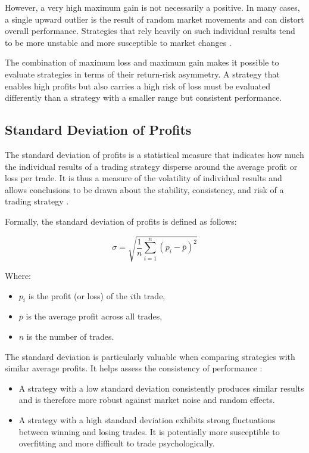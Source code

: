 However, a very high maximum gain is not necessarily a positive.
In many cases, a single upward outlier is the result of random market movements and can distort overall performance.
Strategies that rely heavily on such individual results tend to be more unstable and more susceptible to market changes \cite{max-gain}.

The combination of maximum loss and maximum gain makes it possible to evaluate strategies in terms of their return-risk asymmetry.
A strategy that enables high profits but also carries a high risk of loss must be evaluated differently than a strategy with a smaller range but consistent performance.

\subsection{Standard Deviation of Profits}

The standard deviation of profits is a statistical measure that indicates how much the individual results of a trading strategy disperse around the average profit or loss per trade.
It is thus a measure of the volatility of individual results and allows conclusions to be drawn about the stability, consistency, and risk of a trading strategy \cite{std}.

Formally, the standard deviation of profits is defined as follows:

\[
    \sigma = \sqrt{\frac{1}{n} \sum_{i=1}^n (p_i - \bar{p})^2}
\]

\noindent
Where:

\begin{itemize}
    \item \(p_i\) is the profit (or loss) of the \(i\)th trade,
    \item \(\bar{p}\) is the average profit across all trades,
    \item \(n\) is the number of trades.
\end{itemize}

\noindent
The standard deviation is particularly valuable when comparing strategies with similar average profits.
It helps assess the consistency of performance \cite{std}:

\begin{itemize}
    \item A strategy with a low standard deviation consistently produces similar results and is therefore more robust against market noise and random effects.
    \item A strategy with a high standard deviation exhibits strong fluctuations between winning and losing trades.
    It is potentially more susceptible to overfitting and more difficult to trade psychologically.
\end{itemize}

